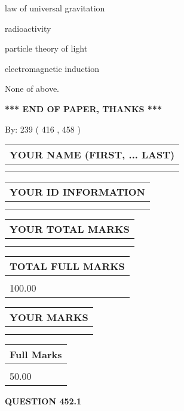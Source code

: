 \documentclass[12pt]{article}
\begin{document}
 
law of universal gravitation
 
 
radioactivity
 
 
particle theory of light
 
 
electromagnetic induction
 
 
 None of above.
 
 
   
   
\vspace{1.0in} 
{\textbf{\large{ *** END OF PAPER, THANKS *** }}} 
   
   
\hspace{1.0in} By: 
 239 ( 416 ,  458 )
   
   
   
   
\newpage 
\setcounter{page}{ 
   452001 } 
   
   
   
   
\noindent\begin{tabular}{|l|}
\hline
YOUR NAME (FIRST, ... LAST)  \\
\hline
 \\ 
 \\ 
\hline
\end{tabular}
\hspace{0.05in} \begin{tabular}{|l|}
\hline
 YOUR   ID   INFORMATION  \\
\hline
 \\ 
 \\ 
\hline
\end{tabular}
   
   
\vspace{0.2in}\noindent\begin{tabular}{|l|}
\hline
YOUR TOTAL MARKS  \\
\hline
 \\ 
 \\ 
\hline
\end{tabular}
\hspace{0.05in} \begin{tabular}{|l|}
\hline
TOTAL FULL MARKS  \\
\hline
 \\ 
100.00 \\
\hline
\end{tabular}
  
\vspace{0.2in}
  
\noindent\begin{tabular}{|l|}
\hline
 YOUR MARKS  \\
\hline
 \\ 
 \\ 
\hline
\end{tabular}
\hspace{0.05in} \begin{tabular}{|l|}
\hline
 Full Marks  \\
\hline
 \\ 
50.00 \\
\hline
\end{tabular}
{\textbf{\Large{QUESTION
452.1 
}}}
  
\end{document}
